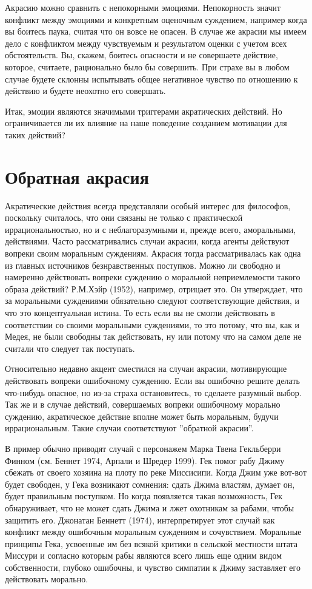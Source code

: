 \documentclass[11pt]{book}
\begin{document}
Акрасию можно сравнить с непокорными эмоциями. Непокорность значит конфликт между эмоциями и конкретным оценочным суждением, например когда вы боитесь паука, считая что он вовсе не опасен. В случае же акрасии мы имеем дело с конфликтом между чувствуемым и результатом оценки с учетом всех обстоятельств. Вы, скажем, боитесь опасности и не совершаете действие, которое, считаете, рационально было бы совершить. При страхе вы в любом случае будете склонны испытывать общее негативное чувство по отношению к действию и будете неохотно его совершать.

Итак, эмоции являются значимыми триггерами акратических действий. Но ограничивается ли их влияние на наше поведение созданием мотивации для таких действий?

\section{Обратная акрасия}

Акратические действия всегда представляли особый интерес для философов, поскольку считалось, что они связаны не только с практической иррациональностью, но и с неблагоразумными и, прежде всего, аморальными, действиями. Часто рассматривались случаи акрасии, когда агенты действуют вопреки своим моральным суждениям. Акрасия тогда рассматривалась как одна из главных источников безнравственных поступков. Можно ли свободно и намеренно действовать вопреки суждению о моральной неприемлемости такого образа действий? Р.М.Хэйр (1952), например, отрицает это. Он утверждает, что за моральными суждениями обязательно следуют соответствующие действия, и что это концептуальная истина. То есть если вы не смогли действовать в соответствии со своими моральными суждениями, то это потому, что вы, как и Медея, не были свободны так действовать, ну или потому что на самом деле не считали что следует так поступать.

Относительно недавно акцент сместился на случаи акрасии, мотивирующие действовать вопреки ошибочному суждению. Если вы ошибочно решите делать что-нибудь опасное, но из-за страха остановитесь, то сделаете разумный выбор. Так же и в случае действий, совершаемых вопреки ошибочному морально суждению, акратическое действие вполне может быть моральным, будучи иррациональным. Такие случаи соответствуют ''обратной акрасии''.

В пример обычно приводят случай с персонажем Марка Твена Гекльберри Финном (см. Беннет 1974, Арпали и Шредер 1999). Гек помог рабу Джиму сбежать от своего хозяина на плоту по реке Миссисипи. Когда Джим уже вот-вот будет свободен, у Гека возникают сомнения: сдать Джима властям, думает он, будет правильным поступком. Но когда появляется такая возможность, Гек обнаруживает, что не может сдать Джима и лжет охотникам за рабами, чтобы защитить его. Джонатан Беннетт (1974), интерпретирует этот случай как конфликт между ошибочным моральным суждениям и сочувствием. Моральные принципы Гека, усвоенные им без всякой критики в сельской местности штата Миссури и согласно которым рабы являются всего лишь еще одним видом собственности, глубоко ошибочны, и чувство симпатии к Джиму заставляет его действовать морально.
\end{document}
